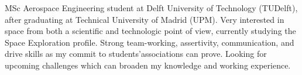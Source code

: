 \documentclass[letter,10pt]{article}
\begin{document}
\justifying

MSc Aerospace Engineering student at Delft University of Technology (TUDelft), after graduating at Technical University of Madrid (UPM). Very interested in space from both a scientific and technologic point of view, currently studying the Space Exploration profile. Strong team-working, assertivity, communication, and drive skills as my commit to students’associations can prove. Looking for upcoming challenges which can broaden my knowledge and working experience.
\end{document}
